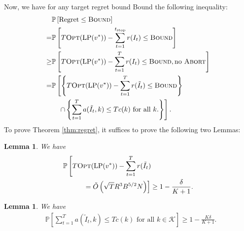 \documentclass{article}
\newtheorem{lemma}[theorem]{Lemma}
\theoremstyle{definition}
\newcommand{\PPP}{\mathbb{P}}
\newcommand{\KKK}{\mathcal{K}}
\begin{document}
Now, we have for any target regret bound {\sc Bound} the following inequality:
\begin{align}
&\PPP\left[\text{Regret}\leq  \text{{\sc Bound}}\right] \nonumber\\
= &\PPP\left[T\text{{\sc Opt}}(\text{LP}(v^*)) - \sum^{t_{\text{stop}}}_{t=1} r(I_t)\leq \text{{\sc Bound}}\right]\nonumber\\
\geq &\PPP\left[T\text{{\sc Opt}}(\text{LP}(v^*)) - \sum^T_{t=1} r(I_t)\leq \text{{\sc Bound}}, \text{no {\sc Abort}}\right] \nonumber\\
= &\PPP\left[\left\{T\text{{\sc Opt}}(\text{LP}(v^*)) - \sum^T_{t=1} r(\tilde{I}_t) \leq \text{{\sc Bound}}\right\}\right. \nonumber\\
&\quad \left. \cap \left\{\sum^T_{t=1}a(\tilde{I}_t, k)\leq Tc(k)\text{ for all $k$.}\right\}\right]. \nonumber
\end{align}
To prove Theorem \ref{thm:regret}, it suffices to prove the following two Lemmas:
\begin{lemma}\label{lemma:revenue}
We have 
\begin{align*}
&\PPP\left[T\text{{\sc Opt}}(\text{LP}(v^*)) - \sum^T_{t=1} r(\tilde{I}_t) \right. \nonumber\\
&\quad \qquad \left. = \tilde{O}\left(\sqrt{T} R^3 B^{5/2} N \right)\right]\geq 1-\frac{\delta}{K+1}.
\end{align*}
\end{lemma}
\begin{lemma}\label{lemma:constraints}
We have
\begin{align*}
&\PPP\left[\sum^T_{t=1} a(\tilde{I}_t, k) \leq Tc(k)\text{ for all $k\in \KKK$}\right] \geq 1-\frac{K\delta}{K+1}.
\end{align*}
\end{lemma}
\end{document}
